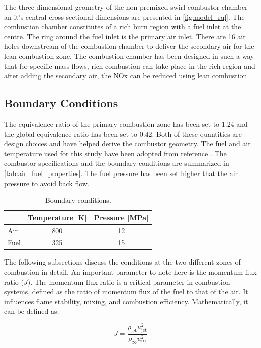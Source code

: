 The three dimensional geometry of the non-premixed swirl combustor chamber an it's central cross-sectional dimensions are presented in \autoref{fig:model_rql}. The combustion chamber constitutes 
of a rich burn region with a fuel inlet at the centre. The ring around the fuel inlet is the primary air inlet. There are 16 air holes downstream of the combustion chamber 
to deliver the secondary air for the lean combustion zone. The combustion chamber has been designed in such a way that for specific mass flows, rich combustion can take place
in the rich region and after adding the secondary air, the NOx can be reduced using lean combustion.

\subsection{Boundary Conditions}

The equivalence ratio of the primary combustion zone has been set to 1.24 and the global equivalence ratio has been set to 0.42. Both of these quantities are design choices
and have helped derive the combustor geometry. The fuel and air temperature used for this study have been adopted from reference \cite{wang2023non}. The combustor specifications
and the boundary conditions are summarized in \autoref{tab:air_fuel_properties}. The fuel pressure has been set higher that the air pressure to avoid back flow.

\begin{table}[H]
    \centering
    \caption{Boundary conditions.}\label{tab:air_fuel_properties}
    \begin{tabular}{lcc}
    \toprule
    & Temperature [K] & Pressure [MPa] \\
    \midrule
    Air  & 800  & 12 \\
    Fuel & 325  & 15 \\
    \bottomrule
    \end{tabular}
\end{table}

The following subsections discuss the conditions at the two different zones of combustion in detail. An important parameter to note here is the momentum flux ratio ($J$).
The momentum flux ratio is a critical parameter in combustion systems, defined as the ratio of momentum flux of the fuel to that of the air. It influences flame stability, mixing, and combustion efficiency. Mathematically, it can be defined as:

\begin{equation}
    J = \frac{\rho_{\text{jet}} u_{\text{jet}}^2}{\rho_{\infty} u_{\infty}^2}
\end{equation}

